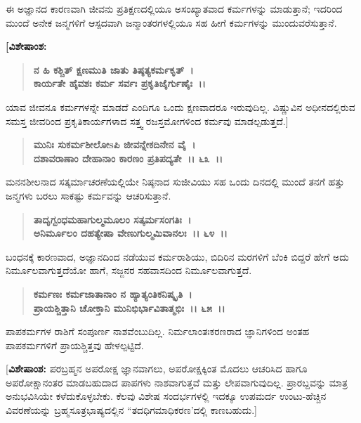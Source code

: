ಈ ಅಜ್ಞಾನದ ಕಾರಣವಾಗಿ ಜೀವನು ಪ್ರತಿಕ್ಷಣದಲ್ಲಿಯೂ ಅಸಂಖ್ಯಾತವಾದ ಕರ್ಮಗಳನ್ನು ಮಾಡುತ್ತಾನೆ; ಇದರಿಂದ ಮುಂದೆ ಅನೇಕ ಜನ್ಮಗಳಿಗೆ ಆಸ್ಪದವಾಗಿ ಜನ್ಮಾಂತರಗಳಲ್ಲಿಯೂ ಸಹ ಹೀಗೆ ಕರ್ಮಗಳನ್ನು ಮುಂದುವರೆಸುತ್ತಾನೆ.

\begin{flushleft}
\textbf{[ವಿಶೇಷಾಂಶ:}
\end{flushleft}

\begin{verse}
\textbf{ನ ಹಿ ಕಶ್ಚಿತ್ ಕ್ಷಣಮುತಿ ಜಾತು ತಿಷ್ಠತ್ಯಕರ್ಮಕೃತ್~।}\\\textbf{ಕಾರ್ಯತೇ ಹೈವಶಃ ಕರ್ಮ ಸರ್ವಃ ಪ್ರಕೃತಿಜೈರ್ಗುಣೈಃ~।।}  
\end{verse}

ಯಾವ ಜೀವನೂ ಕರ್ಮಗಳನ್ನೇ ಮಾಡದೆ ಎಂದಿಗೂ ಒಂದು ಕ್ಷಣವಾದರೂ ಇರುವುದಿಲ್ಲ. ವಿಷ್ಣುವಿನ ಅಧೀನದಲ್ಲಿರುವ ಸಮಸ್ತ ಜೀವರಿಂದ ಪ್ರಕೃತಿಕಾರ್ಯಗಳಾದ ಸತ್ತ್ವ ರಜಸ್ತಮೋಗಳಿಂದ ಕರ್ಮವು ಮಾಡಲ್ಪಡುತ್ತದೆ.]

\begin{verse}
\textbf{ಮುನಿಃ ಸುಕರ್ಮಶೀಲೋsಪಿ ಜೀವನ್ನೇಕದಿನೇನ ವೈ~।}\\\textbf{ದಶಾವರಾಣಾಂ ದೇಹಾನಾಂ ಕಾರಣಂ ಪ್ರತಿಪದ್ಯತೇ~।। ೬೩~।।}
\end{verse}

ಮನನಶೀಲನಾದ ಸತ್ಕರ್ಮಾಚರಣೆಯಲ್ಲಿಯೇ ನಿಷ್ಠನಾದ ಸುಜೀವಿಯು ಸಹ ಒಂದು ದಿನದಲ್ಲಿ ಮುಂದೆ ತನಗೆ ಹತ್ತು ಜನ್ಮಗಳು ಬರಲು ಸಾಕಷ್ಟು ಕರ್ಮವನ್ನು ಆಚರಿಸುತ್ತಾನೆ.

\begin{verse}
\textbf{ತಾದೃಗ್ಬಂಧಮಹಾಗುಲ್ಮಮೂಲಂ ಸತ್ಕರ್ಮಸಂಗತಿಃ~।}\\\textbf{ಅನಿರ್ಮೂಲಂ ದಹತ್ಯೇಷಾ ವೇಣುಗುಲ್ಮಮಿವಾನಲಃ~।। ೬೪~।।}
\end{verse}

ಬಂಧನಕ್ಕೆ ಕಾರಣವಾದ, ಅಜ್ಞಾನದಿಂದ ನಡೆಯುವ ಕರ್ಮರಾಶಿಯು, ಬಿದಿರಿನ ಮರಗಳಿಗೆ ಬೆಂಕಿ ಬಿದ್ದರೆ ಹೇಗೆ ಅದು ನಿರ್ಮೂಲವಾಗುತ್ತದೆಯೋ ಹಾಗೆ, ಸಜ್ಜನರ ಸಹವಾಸದಿಂದ ನಿರ್ಮೂಲವಾಗುತ್ತದೆ.

\begin{verse}
\textbf{ಕರ್ಮಣಃ ಕರ್ಮಜಾತಾನಾಂ ನ ಹ್ಯಾತ್ಯಂತಿಕನಿಷ್ಕೃತಿ~।}\\\textbf{ಪ್ರಾಯಶ್ಚಿತ್ತಾನಿ ಚೋಕ್ತಾನಿ ಮುನಿಭಿರ್ಭಾವಿತಾತ್ಮಭಿಃ~।। ೬೫~।।}
\end{verse}

ಪಾಪಕರ್ಮಗಳ ರಾಶಿಗೆ ಸಂಪೂರ್ಣ ನಾಶವೆಂಬುದಿಲ್ಲ. ನಿರ್ಮಲಾಂತಃಕರಣರಾದ ಜ್ಞಾನಿಗಳಿಂದ ಅಂತಹ ಪಾಪಕರ್ಮಗಳಿಗೆ ಪ್ರಾಯಶ್ಚಿತ್ತವು ಹೇಳಲ್ಪಟ್ಟಿದೆ.

[\textbf{ವಿಶೇಷಾಂಶ:} ಪರಬ್ರಹ್ಮನ ಅಪರೋಕ್ಷ ಜ್ಞಾನವಾಗಲು, ಅಪರೋಕ್ಷಕ್ಕಿಂತ ಮೊದಲು ಆಚರಿಸಿದ ಹಾಗೂ ಅಪರೋಕ್ಷಾನಂತರ ಮಾಡಬಹುದಾದ ಪಾಪಗಳು ನಾಶವಾಗುತ್ತವೆ ಮತ್ತು ಲೇಪವಾಗುವುದಿಲ್ಲ. ಪ್ರಾರಬ್ದವನ್ನು ಮಾತ್ರ ಅನುಭವಿಸಿಯೇ ಕಳೆದುಕೊಳ್ಳಬೇಕು. ಕೆಲವು ವಿಶೇಷ ಸಂದರ್ಭಗಳಲ್ಲಿ ಇದಕ್ಕೂ ಉಪಮರ್ದ ಉಂಟು-ಹೆಚ್ಚಿನ ವಿವರಣೆಯನ್ನು ಬ್ರಹ್ಮಸೂತ್ರಭಾಷ್ಯದಲ್ಲಿನ “ತದಧಿಗಮಾಧಿಕರಣ'ದಲ್ಲಿ ಕಾಣಬಹುದು.]

